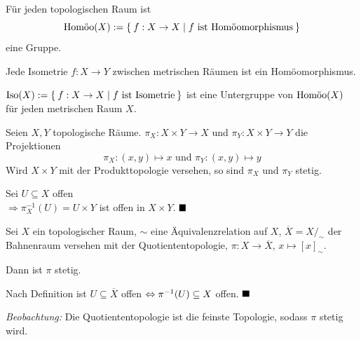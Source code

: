 \begin{bemerkung}
    \begin{bemenum}
        \item {}Für jeden topologischen Raum ist 
              \[\Homoo(X) := \Set{f: X \rightarrow X | f \text{ ist Homöomorphismus}}\]
              eine Gruppe.
        \item {}Jede Isometrie $f:X \rightarrow Y$ zwischen metrischen 
              Räumen ist ein Homöomorphismus.
        \item {}$\Iso(X) := \Set{f:X \rightarrow X | f \text{ ist Isometrie}}$ ist
              eine Untergruppe von $\Homoo(X)$ für jeden
              metrischen Raum $X$.
    \end{bemenum}
\end{bemerkung}

\begin{bemerkung}
    Seien $X, Y$ topologische Räume. $\pi_X: X \times Y \rightarrow X$
    und $\pi_Y: X \times Y \rightarrow Y$ die Projektionen 
    \[\pi_X: (x,y) \mapsto x \text{ und } \pi_Y: (x,y) \mapsto y\]
    Wird $X \times Y$ mit der Produkttopologie versehen, so sind $\pi_X$
    und $\pi_Y$ stetig.
\end{bemerkung}

\begin{beweis}
    Sei $U \subseteq X$ offen\\
    $\Rightarrow \pi_X^{-1} (U) = U \times Y$ ist offen in $X \times Y$. $\qed$
\end{beweis}

\begin{bemerkung}%
    Sei $X$ ein topologischer Raum, $\sim$ eine Äquivalenzrelation auf
    $X$, $\overline{X} = X /_\sim$ der Bahnenraum versehen mit der
    Quotiententopologie, $\pi:X \rightarrow \overline{X}$, $x \mapsto [x]_\sim$.

    Dann ist $\pi$ stetig.
\end{bemerkung}

\begin{beweis}
    Nach Definition ist 
    $U \subseteq \overline{X}$ offen $\gdw \pi^{-1}(U) \subseteq X$ 
    offen. $\qed$
\end{beweis}

\emph{Beobachtung:} Die Quotiententopologie ist die feinste Topologie,
sodass $\pi$ stetig wird.

